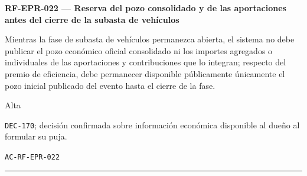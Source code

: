 \documentclass[10pt,letterpaper]{article}
\begin{document}
\noindent\textbf{RF-EPR-022 --- Reserva del pozo consolidado y de las aportaciones antes del cierre de la subasta de vehículos}\par
\begin{description}[style=nextline,leftmargin=3.15cm,labelwidth=2.8cm,font=\normalfont\bfseries]
\item[Obligación] Mientras la fase de subasta de vehículos permanezca abierta, el sistema no debe publicar el pozo económico oficial consolidado ni los importes agregados o individuales de las aportaciones y contribuciones que lo integran; respecto del premio de eficiencia, debe permanecer disponible públicamente únicamente el pozo inicial publicado del evento hasta el cierre de la fase.
\item[Prioridad] Alta
\item[Procedencia] \texttt{DEC-170}; decisión confirmada sobre información económica disponible al dueño al formular su puja.
\item[Verificación] \texttt{AC-RF-EPR-022}
\end{description}
\vspace{0.25em}\hrule\vspace{0.65em}
\end{document}
